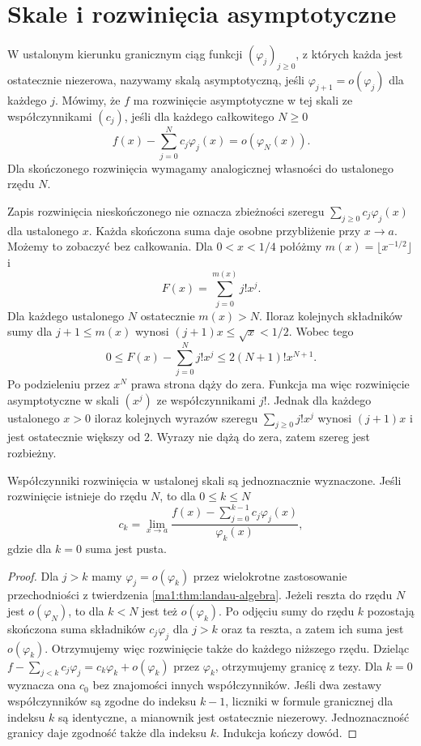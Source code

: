 \section{Skale i rozwinięcia asymptotyczne}
\begin{definicja}
\label{ma1:def:asymptotic-scale}
W ustalonym kierunku granicznym ciąg funkcji $(\varphi_j)_{j\ge0}$, z których każda jest ostatecznie niezerowa, nazywamy skalą asymptotyczną, jeśli $\varphi_{j+1}=o(\varphi_j)$ dla każdego $j$. Mówimy, że $f$ ma rozwinięcie asymptotyczne w tej skali ze współczynnikami $(c_j)$, jeśli dla każdego całkowitego $N\ge0$
\[
 f(x)-\sum_{j=0}^N c_j\varphi_j(x)=o(\varphi_N(x)).
\]
Dla skończonego rozwinięcia wymagamy analogicznej własności do ustalonego rzędu $N$.
\end{definicja}
Zapis rozwinięcia nieskończonego nie oznacza zbieżności szeregu $\sum_{j\ge0}c_j\varphi_j(x)$ dla ustalonego $x$. Każda skończona suma daje osobne przybliżenie przy $x\to a$. Możemy to zobaczyć bez całkowania. Dla $0<x<1/4$ połóżmy $m(x)=\lfloor x^{-1/2}\rfloor$ i
\[
 F(x)=\sum_{j=0}^{m(x)}j!x^j.
\]
Dla każdego ustalonego $N$ ostatecznie $m(x)>N$. Iloraz kolejnych składników sumy dla $j+1\le m(x)$ wynosi $(j+1)x\le\sqrt{x}<1/2$. Wobec tego
\[
 0\le F(x)-\sum_{j=0}^N j!x^j
 \le 2(N+1)!x^{N+1}.
\]
Po podzieleniu przez $x^N$ prawa strona dąży do zera. Funkcja ma więc rozwinięcie asymptotyczne w skali $(x^j)$ ze współczynnikami $j!$. Jednak dla każdego ustalonego $x>0$ iloraz kolejnych wyrazów szeregu $\sum_{j\ge0}j!x^j$ wynosi $(j+1)x$ i jest ostatecznie większy od $2$. Wyrazy nie dążą do zera, zatem szereg jest rozbieżny.

\begin{twierdzenie}
\label{ma1:thm:asymptotic-uniqueness}
Współczynniki rozwinięcia w ustalonej skali są jednoznacznie wyznaczone. Jeśli rozwinięcie istnieje do rzędu $N$, to dla $0\le k\le N$
\[
 c_k=\lim_{x\to a}
 \frac{f(x)-\sum_{j=0}^{k-1}c_j\varphi_j(x)}{\varphi_k(x)},
\]
gdzie dla $k=0$ suma jest pusta.
\end{twierdzenie}
\begin{proof}
Dla $j>k$ mamy $\varphi_j=o(\varphi_k)$ przez wielokrotne zastosowanie przechodniości z twierdzenia \ref{ma1:thm:landau-algebra}. Jeżeli reszta do rzędu $N$ jest $o(\varphi_N)$, to dla $k<N$ jest też $o(\varphi_k)$. Po odjęciu sumy do rzędu $k$ pozostają skończona suma składników $c_j\varphi_j$ dla $j>k$ oraz ta reszta, a zatem ich suma jest $o(\varphi_k)$. Otrzymujemy więc rozwinięcie także do każdego niższego rzędu. Dzieląc
$f-\sum_{j<k}c_j\varphi_j=c_k\varphi_k+o(\varphi_k)$ przez $\varphi_k$, otrzymujemy granicę z tezy. Dla $k=0$ wyznacza ona $c_0$ bez znajomości innych współczynników. Jeśli dwa zestawy współczynników są zgodne do indeksu $k-1$, liczniki w formule granicznej dla indeksu $k$ są identyczne, a mianownik jest ostatecznie niezerowy. Jednoznaczność granicy daje zgodność także dla indeksu $k$. Indukcja kończy dowód.
\end{proof}

